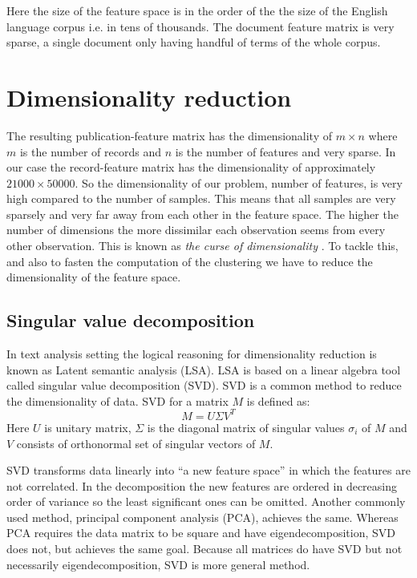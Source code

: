 Here the size of the feature space is in the order of the the 
size of the English language corpus i.e. in tens of thousands. The 
document feature matrix is very sparse, a single document only 
having handful of terms of the whole corpus.



\section{Dimensionality reduction}
\label{sec:dimensionalityreduction}
The resulting publication-feature matrix has the dimensionality 
of $m \times n$ where $m$ is the number of records and $n$ is the 
number of features and very sparse. In our case the record-feature
matrix has the dimensionality of approximately $21000 \times 50000$. 
So the dimensionality of our problem, number of features, is very
high compared to the number of samples. This means that all
samples are very sparsely and very far away from each other in the 
feature space.
The higher the number of dimensions the more 
dissimilar each observation seems from every other observation. 
This is known as \emph{the curse of dimensionality} \cite{trunk_problem_1979}.
To tackle this, and also to fasten the computation of the 
clustering we have to reduce the dimensionality of the feature space.


\subsection{Singular value decomposition}
In text analysis setting the logical reasoning for dimensionality
reduction is known as Latent semantic analysis (LSA)\cite{dumais_using_1988}.
LSA is based on a linear algebra tool called singular value
decomposition (SVD). SVD is a common method to reduce the 
dimensionality of data. SVD for a matrix $M$ is defined as:
\begin{equation}
 M = U \Sigma V^T
\end{equation}
Here $U$ is unitary matrix, $\Sigma$ is the diagonal matrix of singular
values $\sigma_i$ of $M$ and $V$ consists of orthonormal set of singular 
vectors of $M$.

SVD transforms data linearly into ``a new feature space'' in which the 
features are not correlated. In the decomposition the new features are 
ordered in decreasing order of variance so the least significant 
ones can be omitted. 
Another commonly used method, principal component analysis (PCA), 
achieves the same.
Whereas PCA requires the data matrix to be square and have 
eigendecomposition, SVD does not, but achieves the same goal. 
Because all matrices do have SVD but not necessarily 
eigendecomposition, SVD is more general method.


